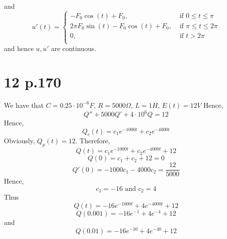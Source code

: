 \documentclass[11pt]{article}
\begin{document}
and 
\[
    u'(t) = 
    \begin{cases}
        -F_0 \cos(t) + F_0, &\text{ if } 0 \le t \le \pi \\
        2\pi F_0 \sin(t) - F_0 \cos(t) + F_0, &\text{ if } \pi \le t \le 2\pi \\
        0, &\text{ if } t > 2\pi \\
    \end{cases}    
\]
and hence $u, u'$ are continuous. 
\newpage
\section*{12 p.170}
We have that $C = 0.25 \cdot 10^{-6} F$, $R = 5000 \Omega$, $L = 1H$, $E(t) = 12V$
Hence, 
\[
    Q'' + 5000Q' + 4 \cdot 10^6 Q = 12    
\]
Hence, 
\[
    Q_c(t) = c_1e^{-1000t} + c_2e^{-4000t}  
\]
Obviously, $Q_p(t) = 12$. Therefore, 
\[
    Q(t) = c_1e^{-1000t} + c_2e^{-4000t} + 12
\]
\[
    Q(0) = c_1 + c_2 + 12 = 0    
\]
\[
    Q'(0) = -1000c_1 -4000c_2 = \frac{12}{5000}
\]
Hence, 
\[
    c_1 = -16 \text{ and } c_2 = 4    
\]
Thus 
\[
    Q(t) = -16e^{-1000t} + 4e^{-4000t} + 12    
\]
\[
    Q(0.001) = -16e^{-1} + 4e^{-4} + 12    
\]
and 
\[
    Q(0.01) = -16e^{-10} + 4e^{-40} + 12   
\] 
\end{document}
